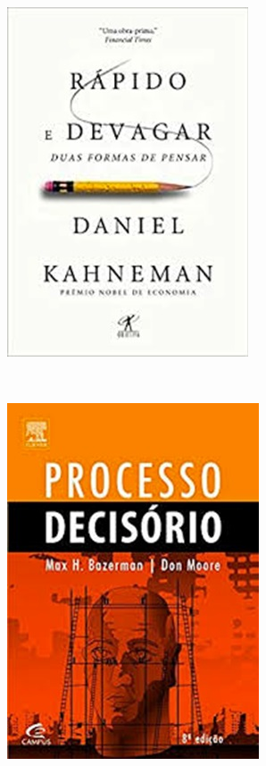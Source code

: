 \documentclass[
  letterpaper,
  DIV=11,
  numbers=noendperiod]{scrreprt}
\begin{document}
\begin{figure}

\begin{minipage}{0.30\linewidth}

\begin{figure}[H]

{\centering \includegraphics[width=0.5\linewidth,height=\textheight,keepaspectratio]{figuras/kahneman.jpg}

}


\end{figure}%

\end{minipage}%
%
\begin{minipage}{0.40\linewidth}
~\end{minipage}%
%
\begin{minipage}{0.30\linewidth}

\begin{figure}[H]

{\centering \includegraphics[width=0.5\linewidth,height=\textheight,keepaspectratio]{figuras/bazerman.jpg}

}
\end{figure}
\end{minipage}
\end{figure}
\end{document}
